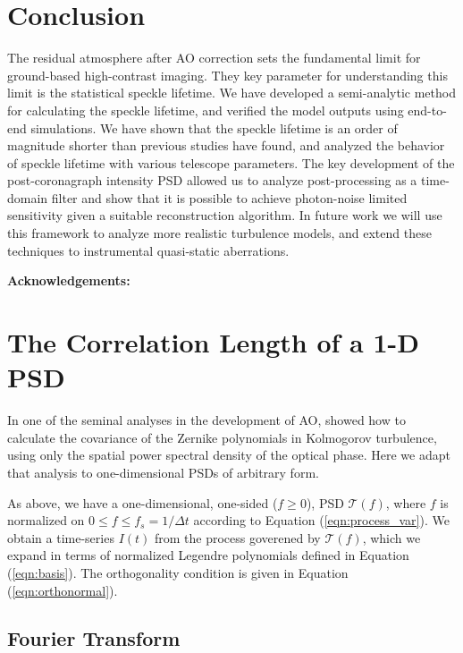 \documentclass[11pt,preprint]{aastex}
\begin{document}
\section{Conclusion}
The residual atmosphere after AO correction sets the fundamental limit for ground-based high-contrast imaging.  They key parameter for understanding this limit is the statistical speckle lifetime.  We have developed a semi-analytic method for calculating the speckle lifetime, and verified the model outputs using end-to-end simulations.  We have shown that the speckle lifetime is an order of magnitude shorter than previous studies have found, and analyzed the behavior of speckle lifetime with various telescope parameters.  The key development of the post-coronagraph intensity PSD allowed us to analyze post-processing as a time-domain filter and show that it is possible to achieve photon-noise limited sensitivity given a suitable reconstruction algorithm. In future work we will use this framework to analyze more realistic turbulence models, and extend these techniques to instrumental quasi-static aberrations.  

\textbf{Acknowledgements:}

\clearpage
\appendix
\section{The Correlation Length of a 1-D PSD}
\label{app:tau_psd}

In one of the seminal analyses in the development of AO, \citet{1976JOSA...66..207N} showed how to calculate the covariance of the Zernike polynomials in Kolmogorov turbulence, using only the spatial power spectral density of the optical phase. Here we adapt that analysis to one-dimensional PSDs of arbitrary form.  

As above, we have a one-dimensional, one-sided ($f \ge 0$),  PSD $\mathcal{T}(f)$, where $f$ is normalized on $0 \leq f \leq f_s = 1/\Delta t$ according to Equation (\ref{eqn:process_var}).  We obtain a time-series $I(t)$ from the process goverened by $\mathcal{T}(f)$, which we expand in terms of normalized Legendre polynomials defined in Equation (\ref{eqn:basis}).  The orthogonality condition is given in Equation (\ref{eqn:orthonormal}).
 
\subsection{Fourier Transform}
\end{document}
